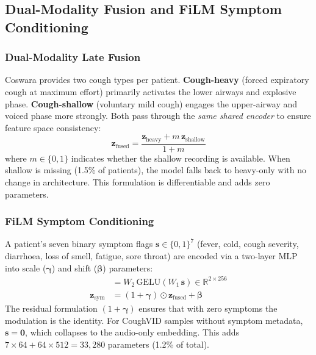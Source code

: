 \documentclass[journal]{IEEEtran}
\newcommand{\R}{\mathbb{R}}
\begin{document}
\subsection{Dual-Modality Fusion and FiLM Symptom Conditioning}
\label{sec:multimodal}

\subsubsection{Dual-Modality Late Fusion}
Coswara provides two cough types per patient. \textbf{Cough-heavy}
(forced expiratory cough at maximum effort) primarily activates the
lower airways and explosive phase. \textbf{Cough-shallow} (voluntary
mild cough) engages the upper-airway and voiced phase more strongly.
Both pass through the \emph{same shared encoder} to ensure feature
space consistency:
\begin{equation}
\mathbf{z}_\text{fused} = \frac{\mathbf{z}_\text{heavy} + m\,\mathbf{z}_\text{shallow}}{1 + m}
\label{eq:lf}
\end{equation}
where $m \in \{0,1\}$ indicates whether the shallow recording is
available. When shallow is missing (1.5\% of patients), the model
falls back to heavy-only with no change in architecture. This
formulation is differentiable and adds zero parameters.

\subsubsection{FiLM Symptom Conditioning}
A patient's seven binary symptom flags
$\mathbf{s}\in\{0,1\}^7$ (fever, cold, cough severity,
diarrhoea, loss of smell, fatigue, sore throat) are encoded via a
two-layer MLP into scale ($\boldsymbol{\gamma}$) and shift
($\boldsymbol{\beta}$) parameters:
\begin{align}
[\boldsymbol{\gamma},\boldsymbol{\beta}] &=
  W_2\,\mathrm{GELU}(W_1\,\mathbf{s}) \in \R^{2\times256}
\label{eq:film_params}\\
\mathbf{z}_\text{sym} &= (1 + \boldsymbol{\gamma}) \odot \mathbf{z}_\text{fused}
                         + \boldsymbol{\beta}
\label{eq:film}
\end{align}
The residual formulation $(1 + \boldsymbol{\gamma})$ ensures that with
zero symptoms the modulation is the identity. For CoughVID samples
without symptom metadata, $\mathbf{s} = \mathbf{0}$, which collapses
to the audio-only embedding. This adds $7{\times}64 + 64{\times}512
= 33{,}280$ parameters (1.2\% of total).
\end{document}
